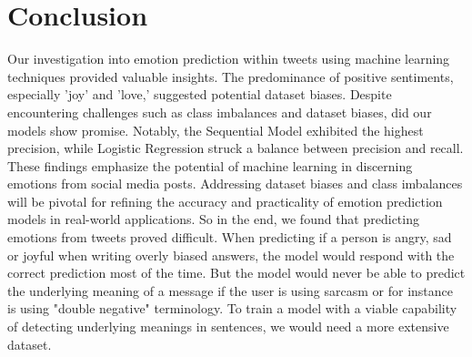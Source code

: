 \section{Conclusion}

Our investigation into emotion prediction within tweets using machine learning techniques provided valuable insights. The predominance of positive sentiments, especially 'joy' and 'love,' suggested potential dataset biases. Despite encountering challenges such as class imbalances and dataset biases, did our models show promise. Notably, the Sequential Model exhibited the highest precision, while Logistic Regression struck a balance between precision and recall. These findings emphasize the potential of machine learning in discerning emotions from social media posts. Addressing dataset biases and class imbalances will be pivotal for refining the accuracy and practicality of emotion prediction models in real-world applications.
So in the end, we found that predicting emotions from tweets proved difficult. When predicting if a person is angry, sad or joyful when writing overly biased answers, the model would respond with the correct prediction most of the time. But the model would never be able to predict the underlying meaning of a message if the user is using sarcasm or for instance is using "double negative" terminology. To train a model with a viable capability of detecting underlying meanings in sentences, we would need a more extensive dataset.